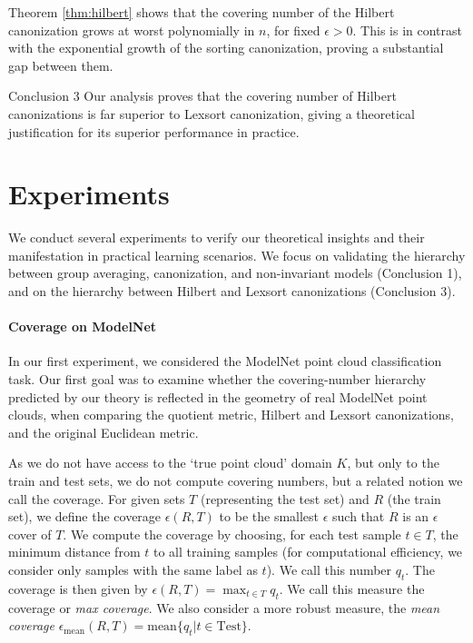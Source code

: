 \documentclass{article}
\begin{document}
 Theorem \ref{thm:hilbert} shows that the covering number of the Hilbert canonization grows at worst polynomially in $n$, for fixed $\epsilon>0$. This is in contrast with the exponential growth of the sorting canonization, proving a substantial gap between them. 

\begin{conclusionbox}{Conclusion 3}
 Our analysis proves that the covering number of Hilbert canonizations is far superior to Lexsort canonization, giving a theoretical justification for its superior performance in practice. 
\end{conclusionbox}

\section{Experiments}
\label{sec:experiments}
We conduct several experiments to verify our theoretical insights and their manifestation in practical learning scenarios. We focus on validating the hierarchy between group averaging, canonization, and non-invariant models (Conclusion 1), and on the hierarchy between Hilbert and Lexsort canonizations (Conclusion 3).  

\paragraph{Coverage on ModelNet} In our first experiment, we considered the ModelNet \cite{wu20153d} point cloud classification task. Our first goal was to examine whether the covering-number hierarchy predicted by our theory is reflected in the geometry of real ModelNet point clouds, when comparing the quotient metric, Hilbert and Lexsort canonizations, and the original Euclidean metric.   

As we do not have access to the `true point cloud' domain $K$, but only to the train and test sets, we do not compute covering numbers, but a related notion we call the coverage. For given sets $T$ (representing the test set) and $R$ (the train set), we define the coverage $\epsilon(R,T)$  to be the smallest $\epsilon$ such that $R$ is an $\epsilon$ cover of $T$. We compute the coverage by choosing, for each test sample $t\in T$, the minimum distance from $t$ to all training samples (for computational efficiency, we consider only samples with the same label as $t$). We call this number $q_t$. The coverage is then given by $\epsilon(R,T)=\max_{t\in T} q_t $. We call this measure the coverage or \emph{max coverage}. We also consider a more robust measure, the \emph{mean coverage} $\epsilon_{\mathrm{mean}}(R,T)=\mathrm{mean} \{ q_t| t\in \mathrm{Test} \} $. 
\end{document}
